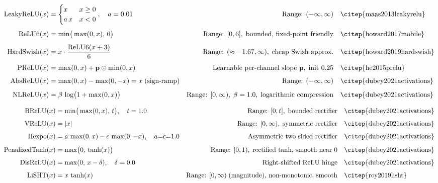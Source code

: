 {\scriptsize
\begin{align}
  \text{LeakyReLU}(x) &= \begin{cases} x & x\ge 0 \\ a\,x & x < 0 \end{cases},
    \quad a=0.01
    & \text{Range: } (-\infty,\infty)
    & \quad \text{\citep{maas2013leakyrelu}} \\[4pt]
  \text{ReLU6}(x) &= \min\!\big(\max(0,x),\,6\big)
    & \text{Range: } [0,6],\;\text{bounded, fixed-point friendly}
    & \quad \text{\citep{howard2017mobile}} \\[4pt]
  \text{HardSwish}(x) &= x\cdot\frac{\text{ReLU6}(x+3)}{6}
    & \text{Range: } (\approx{-1.67},\infty),\;\text{cheap Swish approx.}
    & \quad \text{\citep{howard2019hardswish}} \\[4pt]
  \text{PReLU}(x) &= \max(0,x)+\mathbf{p}\odot\min(0,x)
    & \text{Learnable per-channel slope } \mathbf{p},\;\text{init 0.25}
    & \quad \text{\citep{he2015prelu}} \\[4pt]
  \text{AbsReLU}(x) &= \max(0,x)-\max(0,-x) = x\;\text{(sign-ramp)}
    & \text{Range: } (-\infty,\infty)
    & \quad \text{\citep{dubey2021activations}} \\[4pt]
  \text{NLReLU}(x) &= \beta\,\log\!\big(1+\max(0,x)\big)
    & \text{Range: } [0,\infty),\;\beta=1.0,\;\text{logarithmic compression}
    & \quad \text{\citep{dubey2021activations}}
\end{align}
}  %

{\scriptsize
\begin{align}
  \text{BReLU}(x) &= \min\!\big(\max(0,x),\,t\big),\quad t=1.0
    & \text{Range: } [0,t],\;\text{bounded rectifier}
    & \quad \text{\citep{dubey2021activations}} \\[4pt]
  \text{VReLU}(x) &= |x|
    & \text{Range: } [0,\infty),\;\text{symmetric rectifier}
    & \quad \text{\citep{dubey2021activations}} \\[4pt]
  \text{Hexpo}(x) &= a\,\max(0,x)-c\,\max(0,-x),\quad a{=}c{=}1.0
    & \text{Asymmetric two-sided rectifier}
    & \quad \text{\citep{dubey2021activations}} \\[4pt]
  \text{PenalizedTanh}(x) &= \max\!\big(0,\,\tanh(x)\big)
    & \text{Range: } [0,1),\;\text{rectified tanh, smooth near 0}
    & \quad \text{\citep{dubey2021activations}} \\[4pt]
  \text{DisReLU}(x) &= \max(0,\,x-\delta),\quad \delta=0.0
    & \text{Right-shifted ReLU hinge}
    & \quad \text{\citep{dubey2021activations}} \\[4pt]
  \text{LiSHT}(x) &= x\,\tanh(x)
    & \text{Range: } [0,\infty)\;\text{(magnitude), non-monotonic, smooth}
    & \quad \text{\citep{roy2019lisht}}
\end{align}
}  %


